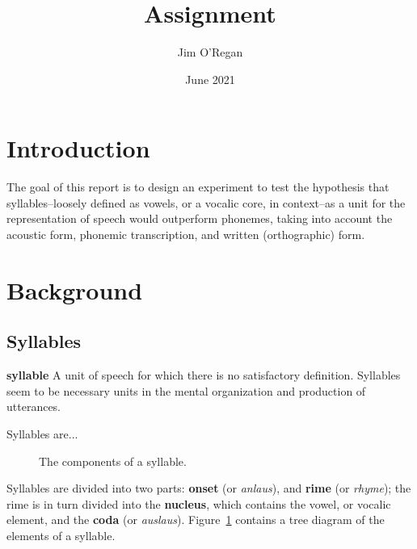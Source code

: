 \documentclass{article}[11pt]
\title{Assignment}
\author{Jim O'Regan}
\date{June 2021}
\begin{document}
\maketitle

\section{Introduction}
\label{sect:intro}

The goal of this report is to design an experiment to test the hypothesis that syllables--loosely defined as vowels, or a vocalic core, in context--as a unit for the representation of speech would outperform phonemes, taking into account the acoustic form, phonemic transcription, and written (orthographic) form.

\section{Background}
\label{sect:bg}

\subsection{Syllables}
\label{ssect:syllables}

\begin{displayquote}
\textbf{syllable} A unit of speech for which there is
no satisfactory definition. Syllables seem to
be necessary units in the mental organization and production of utterances.~\citep{ladefoged_course_2011}
\end{displayquote}

Syllables are...

\begin{figure}[!h]
\caption{The components of a syllable.}
\label{fig:syll}
\centering
{}
\end{figure}

Syllables are divided into two parts: \textbf{onset} (or \textit{anlaus}), and \textbf{rime} (or \textit{rhyme}); the rime is in turn divided into the \textbf{nucleus}, which contains the vowel, or vocalic element, and the \textbf{coda} (or \textit{auslaus}). Figure~\ref{fig:syll} contains a tree diagram of the elements of a syllable.
\end{document}
